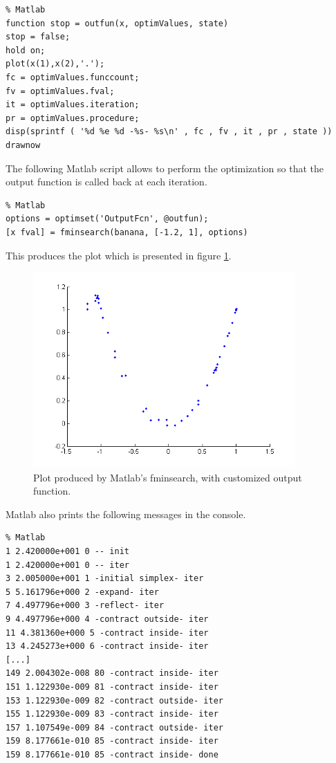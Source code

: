 \lstset{language=matlabscript}
\begin{lstlisting}
% Matlab
function stop = outfun(x, optimValues, state)
stop = false;
hold on;
plot(x(1),x(2),'.');
fc = optimValues.funccount;
fv = optimValues.fval;
it = optimValues.iteration;
pr = optimValues.procedure;
disp(sprintf ( '%d %e %d -%s- %s\n' , fc , fv , it , pr , state ))
drawnow
\end{lstlisting}

The following Matlab script allows to perform the optimization
so that the output function is called back at each iteration.

\lstset{language=matlabscript}
\begin{lstlisting}
% Matlab
options = optimset('OutputFcn', @outfun);
[x fval] = fminsearch(banana, [-1.2, 1], options)
\end{lstlisting}

This produces the plot which is presented in figure \ref{fig-fminsearch-matlab-outputfun}.

\begin{figure}
\begin{center}
\includegraphics[width=10cm]{testFminsearchPlotMatlab.png}
\end{center}
\caption{Plot produced by Matlab's fminsearch, with customized output function.}
\label{fig-fminsearch-matlab-outputfun}
\end{figure}

Matlab also prints the following messages in the console.

\lstset{language=matlabscript}
\begin{lstlisting}
% Matlab
1 2.420000e+001 0 -- init
1 2.420000e+001 0 -- iter
3 2.005000e+001 1 -initial simplex- iter
5 5.161796e+000 2 -expand- iter
7 4.497796e+000 3 -reflect- iter
9 4.497796e+000 4 -contract outside- iter
11 4.381360e+000 5 -contract inside- iter
13 4.245273e+000 6 -contract inside- iter
[...]
149 2.004302e-008 80 -contract inside- iter
151 1.122930e-009 81 -contract inside- iter
153 1.122930e-009 82 -contract outside- iter
155 1.122930e-009 83 -contract inside- iter
157 1.107549e-009 84 -contract outside- iter
159 8.177661e-010 85 -contract inside- iter
159 8.177661e-010 85 -contract inside- done
\end{lstlisting}

